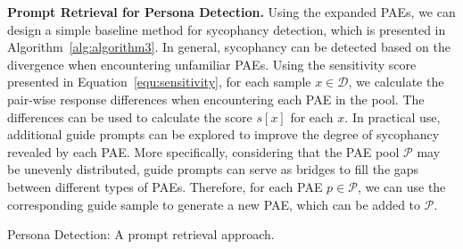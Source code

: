 {\begin{algorithm}[!t]
{        
    }
\end{algorithm}

\textbf{Prompt Retrieval for Persona Detection.} Using the expanded PAEs, we can design a simple baseline method for sycophancy detection, which is presented in Algorithm~\ref{alg:algorithm3}. In general, sycophancy can be detected based on the divergence when encountering unfamiliar PAEs. Using the sensitivity score presented in Equation~\ref{equ:sensitivity}, for each sample $x \in \mathcal{D}$, we calculate the pair-wise response differences when encountering each PAE in the pool. The differences can be used to calculate the score $s[x]$ for each $x$. In practical use, additional guide prompts can be explored to improve the degree of sycophancy revealed by each PAE. More specifically, considering that the PAE pool $\mathcal{P}$ may be unevenly distributed, guide prompts can serve as bridges to fill the gaps between different types of PAEs. Therefore, for each PAE $p \in \mathcal{P}$, we can use the corresponding guide sample to generate a new PAE, which can be added to $\mathcal{P}$.

\begin{algorithm}[!t]
\SetNoFillInSpace
\SetAlgoVspace{-0.1 cm}
\caption{Persona Detection: A prompt retrieval approach.}
\label{alg:algorithm3}
\SetNoFillComment
\SetNColorOnly
\LARGE
\linesnumbered
{}
    

\end{algorithm}}

